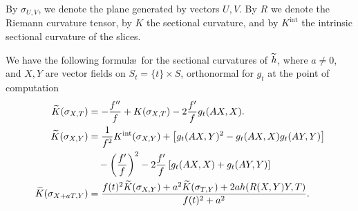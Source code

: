 \documentclass[AHL,Unicode,longabstracts,published]{cedram}
\DeclareMathOperator{\intt}{int}
\theoremstyle{plain}
\let\oldtilde\tilde
\renewcommand*{\tilde}[1]{\mathchoice{\widetilde{#1}}{\widetilde{#1}}{\oldtilde{#1}}{\oldtilde{#1}}}
\begin{document}
By $\sigma_{U,V}$, we denote the plane generated by vectors $U,V$. By $R$ we denote the Riemann curvature tensor, by $K$ the sectional curvature, and by $K^{\intt}$ the intrinsic sectional curvature of the slices.

\begin{prop}\label{prop:gauss-codazzi}
We have the following formul\ae\ for the sectional curvatures of $\tilde{h}$, where $a\neq 0$, and $X,Y$ are vector fields on $S_t=\{t\}\times S$, orthonormal for $g_t$ at the point of computation
\begin{align*}
\tilde{K}(\sigma_{X,T}) &= -\frac{f''}{f} + K(\sigma_{X,T}) - 2 \frac{f'}{f} g_t(AX,X). \\
\tilde{K}(\sigma_{X,Y}) &= \frac{1}{f^2} K^{\intt}(\sigma_{X,Y}) + \left[g_t(AX,Y)^2 - g_t(AX,X)g_t(AY,Y)\right] \\
&\quad - \left(\frac{f'}{f}\right)^2 - 2 \frac{f'}{f}\left[g_t(AX,X)+ g_t(AY,Y)\right]\\
\tilde{K}(\sigma_{X+aT,Y})&= \frac{ f(t)^2 \tilde{K}(\sigma_{X,Y}) + a^2 \tilde{K}(\sigma_{T,Y}) + 2a h(R(X,Y)Y,T)}{f(t)^2 + a^2}.
\end{align*}
\end{prop}
\end{document}
